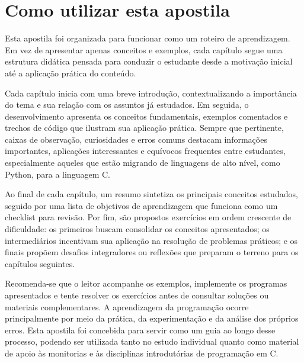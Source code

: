 \documentclass[12pt,a4paper,oneside]{extreport}
\begin{document}
\chapter*{Como utilizar esta apostila}

Esta apostila foi organizada para funcionar como um roteiro de aprendizagem. Em vez de apresentar apenas conceitos e exemplos, cada capítulo segue uma estrutura didática pensada para conduzir o estudante desde a motivação inicial até a aplicação prática do conteúdo.

Cada capítulo inicia com uma breve introdução, contextualizando a importância do tema e sua relação com os assuntos já estudados. Em seguida, o desenvolvimento apresenta os conceitos fundamentais, exemplos comentados e trechos de código que ilustram sua aplicação prática. Sempre que pertinente, caixas de observação, curiosidades e erros comuns destacam informações importantes, aplicações interessantes e equívocos frequentes entre estudantes, especialmente aqueles que estão migrando de linguagens de alto nível, como Python, para a linguagem C.

Ao final de cada capítulo, um resumo sintetiza os principais conceitos estudados, seguido por uma lista de objetivos de aprendizagem que funciona como um checklist para revisão. Por fim, são propostos exercícios em ordem crescente de dificuldade: os primeiros buscam consolidar os conceitos apresentados; os intermediários incentivam sua aplicação na resolução de problemas práticos; e os finais propõem desafios integradores ou reflexões que preparam o terreno para os capítulos seguintes.

Recomenda-se que o leitor acompanhe os exemplos, implemente os programas apresentados e tente resolver os exercícios antes de consultar soluções ou materiais complementares. A aprendizagem da programação ocorre principalmente por meio da prática, da experimentação e da análise dos próprios erros. Esta apostila foi concebida para servir como um guia ao longo desse processo, podendo ser utilizada tanto no estudo individual quanto como material de apoio às monitorias e às disciplinas introdutórias de programação em C.



\tableofcontents
\clearpage


\end{document}
